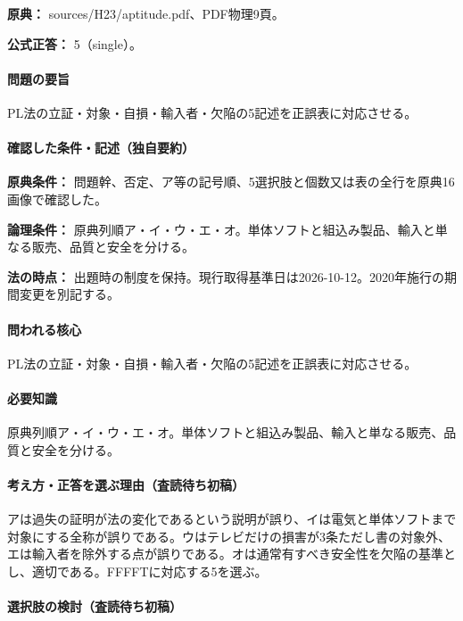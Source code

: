 \noindent\textbf{原典：} sources/H23/aptitude.pdf、PDF物理9頁。

\textbf{公式正答：} 5（single）。

\paragraph{問題の要旨} PL法の立証・対象・自損・輸入者・欠陥の5記述を正誤表に対応させる。

\paragraph{確認した条件・記述（独自要約）}\mbox{}\par

\noindent\textbf{原典条件：} 問題幹、否定、ア等の記号順、5選択肢と個数又は表の全行を原典16画像で確認した。\par

\noindent\textbf{論理条件：} 原典列順ア・イ・ウ・エ・オ。単体ソフトと組込み製品、輸入と単なる販売、品質と安全を分ける。\par

\noindent\textbf{法の時点：} 出題時の制度を保持。現行取得基準日は2026-10-12。2020年施行の期間変更を別記する。\par

\paragraph{問われる核心} PL法の立証・対象・自損・輸入者・欠陥の5記述を正誤表に対応させる。

\paragraph{必要知識} 原典列順ア・イ・ウ・エ・オ。単体ソフトと組込み製品、輸入と単なる販売、品質と安全を分ける。

\paragraph{考え方・正答を選ぶ理由（査読待ち初稿）} アは過失の証明が法の変化であるという説明が誤り、イは電気と単体ソフトまで対象にする全称が誤りである。ウはテレビだけの損害が3条ただし書の対象外、エは輸入者を除外する点が誤りである。オは通常有すべき安全性を欠陥の基準とし、適切である。FFFFTに対応する5を選ぶ。

\paragraph{選択肢の検討（査読待ち初稿）}\mbox{}\par

